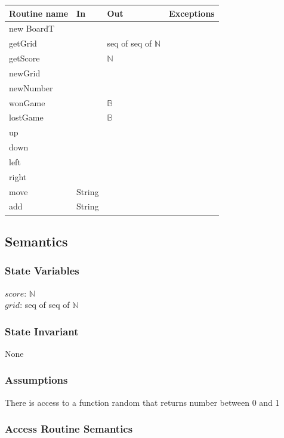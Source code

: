 \documentclass[12pt]{article}
\begin{document}
\begin{tabular}{| l | l | l | p{5cm} |}
  \hline
  \textbf{Routine name} & \textbf{In} & \textbf{Out} & \textbf{Exceptions}\\
  \hline
  new BoardT & & & \\
  \hline
  getGrid & & seq of seq of $\mathbb{N}$& \\
  \hline
  getScore & & $\mathbb{N}$ & \\
  \hline
  newGrid & & & \\
  \hline
  newNumber & & & \\
  \hline
  wonGame & & $\mathbb{B}$ & \\
  \hline
  lostGame & & $\mathbb{B}$ & \\
  \hline
  up & & & \\
  \hline
  down & & & \\
  \hline
  left & & & \\
  \hline
  right & & & \\
  \hline 
  move & String & & \\
  \hline
  add & String & & \\
  \hline  
\end{tabular}

\subsection* {Semantics}

\subsubsection* {State Variables}

$\mathit{score}$: $\mathbb{N}$\\
$\mathit{grid}$: seq of seq of $\mathbb{N}$

\subsubsection* {State Invariant}

None

\subsubsection* {Assumptions}

There is access to a function random that returns number between 0 and 1 

\subsubsection* {Access Routine Semantics}
\end{document}
